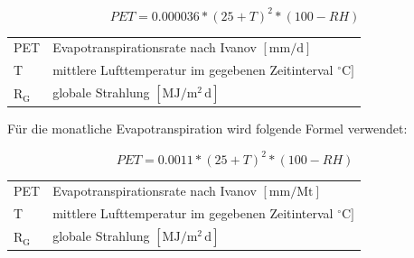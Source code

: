\begin{equation}
\label{eq:ivanov_d}
PET=0.000036*(25+T)^2*(100-RH)
\end{equation}
\begin{table}[H]
\centering
\begin{tabular}{ll}
PET & Evapotranspirationsrate nach Ivanov  $\mathrm{[mm/d]}$\\
T & mittlere Lufttemperatur im gegebenen Zeitinterval $\mathrm{{^\circ}C]}$\\
$\mathrm{R_G}$ & globale Strahlung $\mathrm{[MJ/m^2\,d]}$\\
\end{tabular}
\end{table}

Für die monatliche Evapotranspiration wird folgende Formel verwendet:

\begin{equation}
\label{eq:ivanov_m}
PET=0.0011*(25+T)^2*(100-RH)
\end{equation}
\begin{table}[H]
\centering
\begin{tabular}{ll}
PET & Evapotranspirationsrate nach Ivanov  $\mathrm{[mm/Mt]}$\\
T & mittlere Lufttemperatur im gegebenen Zeitinterval $\mathrm{{^\circ}C]}$\\
$\mathrm{R_G}$ & globale Strahlung $\mathrm{[MJ/m^2\,d]}$\\
\end{tabular}
\end{table}






